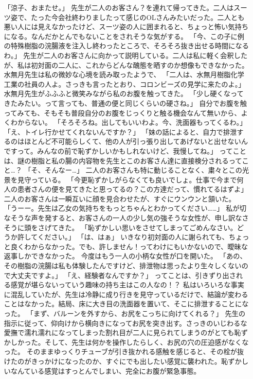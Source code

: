 「涼子、おまたせ。」
先生が二人のお客さん？を連れて帰ってきた。二人はスーツ姿で、たった今会社終わりましたって感じのOLさんみたいだった。二人とも悪い人には見えなかったけど、スーツ姿の人に囲まれると、ちょっと怖い気持ちになる。なんだかとんでもないことをされそうな気がする。
「今、この子に例の特殊樹脂の浣腸液を注入し終わったところで、そろそろ抜き出せる時間になるわ。」
先生が二人のお客さんに向かって説明している。二人は私に軽く会釈したが、私は初対面の二人に、これからどんな醜態を晒すのか想像もできなかった。水無月先生は私の微妙な心境を読み取ったようで、
「二人は、水無月樹脂化学工業の社員の人よ。さっきも言ったとおり、コロンビーズの見学に来たのよ。」
水無月先生がふふふと微笑みながら私のお腹を触ってきた。
「少し硬くなってきたみたい。って言っても、普通の便と同じくらいの硬さね。」
自分でお腹を触ってみても、そもそも普段自分のお腹をじっくりと触る機会なんて無いから、よくわからない。
「そろそろね。出してもいいわよ。今、洗面器もってくるわ。」
「え、トイレ行かせてくれないんですか？」
「妹の話によると、自力で排泄するのはほとんど不可能らしくて、他の人が引っ張り出してあげないと出せないんですって。みんなの前で恥ずかしいかもしれないけど、我慢してね。」
ってことは、謎の樹脂と私の腸の内容物を先生とこのお客さん達に直接検分されるってこと…？
「そ、そんなー…」
二人のお客さんも特に動じることなく、粛々とこの光景を見守っている。
「今更恥ずかしがらなくても良いでしょ。仕事で今まで何人の患者さんの便を見てきたと思ってるの？この方達だって、慣れてるはずよ」
二人のお客さんは一瞬互いに顔を見合わせたが、すぐにウンウンと頷いた。
「うーー。先生は乙女の気持ちをもっとちゃんとわかってください……」
私が切なそうな声を発すると、お客さんの一人の少し気の強そうな女性が、申し訳なさそうに頭をさげてきた。
「恥ずかしい思いをさせてしまってごめんなさい。どうか許してください。」
「は、はぁ」
いきなり初対面の人に謝られても、ちょっと良くわからなかった。でも、許しません！ってわけにもいかないので、曖昧な返事しかできなかった。
今度はもう一人の小柄な女性が口を開いた。
「あの、その樹脂の浣腸は私も体験したんですけど、排泄物は思ったより生々しくないので大丈夫ですよ。」
「え、経験者なんですか？」
ってことは、引きずり出される感覚が堪らないっていう趣味の持ち主はこの人なの！？
私はいろいろな事実に混乱していたが、先生は冷静に成り行きを見守っているだけで、結論が変わることはなかった。結局、床に大き目の洗面器を置いて、そこに排泄することになった。
「まず、バルーンを外すから、お尻をこっちに向けてくれる？」
先生の指示に従って、仰向けから横向きになってお尻を突き出す。さっきのいじわるな愛撫で濡れ濡れになってしまった割れ目が二人に見られてしまうのがとても恥ずかしかった。そして、先生は何かを操作したらしく、お尻の穴の圧迫感がなくなった。
そのままゆっくりチューブが引き抜かれる感触を感じると、その栓が抜けたのがきっかけになったのか、すぐにでも出したい感覚に襲われた。恥ずかしいなんている感覚はすっとんでしまい、完全にお腹が緊急事態。
